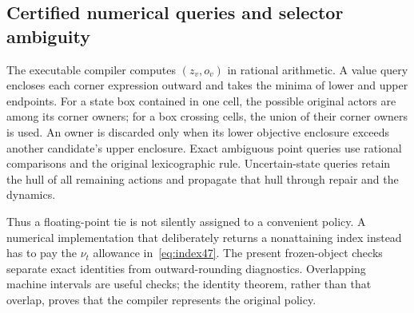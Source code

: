 \subsection{Certified numerical queries and selector ambiguity}
The executable compiler computes $(z_v,o_v)$ in rational arithmetic. A value query encloses each corner expression outward and takes the minima of lower and upper endpoints. For a state box contained in one cell, the possible original actors are among its corner owners; for a box crossing cells, the union of their corner owners is used. An owner is discarded only when its lower objective enclosure exceeds another candidate's upper enclosure. Exact ambiguous point queries use rational comparisons and the original lexicographic rule. Uncertain-state queries retain the hull of all remaining actions and propagate that hull through repair and the dynamics.

Thus a floating-point tie is not silently assigned to a convenient policy. A numerical implementation that deliberately returns a nonattaining index instead has to pay the $\nu_t$ allowance in~\eqref{eq:index47}. The present frozen-object checks separate exact identities from outward-rounding diagnostics. Overlapping machine intervals are useful checks; the identity theorem, rather than that overlap, proves that the compiler represents the original policy.
